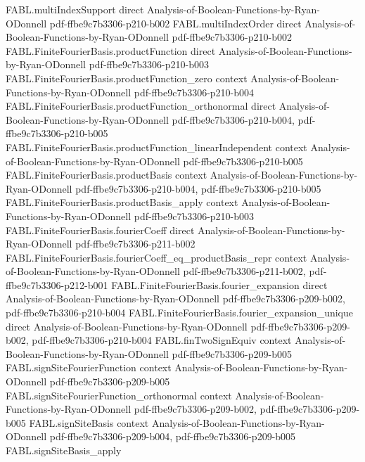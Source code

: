 \begin{theorem}
\proofstep
  {FABL.multiIndexSupport}
  {direct}
  {Analysis-of-Boolean-Functions-by-Ryan-ODonnell}
  {pdf-ffbe9c7b3306-p210-b002}
\proofstep
  {FABL.multiIndexOrder}
  {direct}
  {Analysis-of-Boolean-Functions-by-Ryan-ODonnell}
  {pdf-ffbe9c7b3306-p210-b002}
\proofstep
  {FABL.FiniteFourierBasis.productFunction}
  {direct}
  {Analysis-of-Boolean-Functions-by-Ryan-ODonnell}
  {pdf-ffbe9c7b3306-p210-b003}
\proofstep
  {FABL.FiniteFourierBasis.productFunction_zero}
  {context}
  {Analysis-of-Boolean-Functions-by-Ryan-ODonnell}
  {pdf-ffbe9c7b3306-p210-b004}
\proofstep
  {FABL.FiniteFourierBasis.productFunction_orthonormal}
  {direct}
  {Analysis-of-Boolean-Functions-by-Ryan-ODonnell}
  {pdf-ffbe9c7b3306-p210-b004,
    pdf-ffbe9c7b3306-p210-b005}
\proofstep
  {FABL.FiniteFourierBasis.productFunction_linearIndependent}
  {context}
  {Analysis-of-Boolean-Functions-by-Ryan-ODonnell}
  {pdf-ffbe9c7b3306-p210-b005}
\proofstep
  {FABL.FiniteFourierBasis.productBasis}
  {context}
  {Analysis-of-Boolean-Functions-by-Ryan-ODonnell}
  {pdf-ffbe9c7b3306-p210-b004,
    pdf-ffbe9c7b3306-p210-b005}
\proofstep
  {FABL.FiniteFourierBasis.productBasis_apply}
  {context}
  {Analysis-of-Boolean-Functions-by-Ryan-ODonnell}
  {pdf-ffbe9c7b3306-p210-b003}
\proofstep
  {FABL.FiniteFourierBasis.fourierCoeff}
  {direct}
  {Analysis-of-Boolean-Functions-by-Ryan-ODonnell}
  {pdf-ffbe9c7b3306-p211-b002}
\proofstep
  {FABL.FiniteFourierBasis.fourierCoeff_eq_productBasis_repr}
  {context}
  {Analysis-of-Boolean-Functions-by-Ryan-ODonnell}
  {pdf-ffbe9c7b3306-p211-b002,
    pdf-ffbe9c7b3306-p212-b001}
\proofstep
  {FABL.FiniteFourierBasis.fourier_expansion}
  {direct}
  {Analysis-of-Boolean-Functions-by-Ryan-ODonnell}
  {pdf-ffbe9c7b3306-p209-b002,
    pdf-ffbe9c7b3306-p210-b004}
\proofstep
  {FABL.FiniteFourierBasis.fourier_expansion_unique}
  {direct}
  {Analysis-of-Boolean-Functions-by-Ryan-ODonnell}
  {pdf-ffbe9c7b3306-p209-b002,
    pdf-ffbe9c7b3306-p210-b004}
\proofstep
  {FABL.finTwoSignEquiv}
  {context}
  {Analysis-of-Boolean-Functions-by-Ryan-ODonnell}
  {pdf-ffbe9c7b3306-p209-b005}
\proofstep
  {FABL.signSiteFourierFunction}
  {context}
  {Analysis-of-Boolean-Functions-by-Ryan-ODonnell}
  {pdf-ffbe9c7b3306-p209-b005}
\proofstep
  {FABL.signSiteFourierFunction_orthonormal}
  {context}
  {Analysis-of-Boolean-Functions-by-Ryan-ODonnell}
  {pdf-ffbe9c7b3306-p209-b002,
    pdf-ffbe9c7b3306-p209-b005}
\proofstep
  {FABL.signSiteBasis}
  {context}
  {Analysis-of-Boolean-Functions-by-Ryan-ODonnell}
  {pdf-ffbe9c7b3306-p209-b004,
    pdf-ffbe9c7b3306-p209-b005}
\proofstep
  {FABL.signSiteBasis_apply}

\end{theorem}
